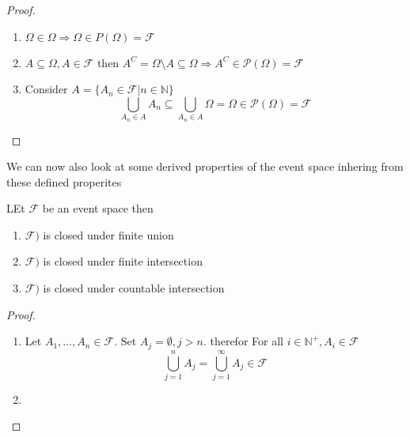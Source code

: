 \documentclass{article}
\begin{document}
\begin{proof}
    \begin{enumerate}
        \item $\Omega \in \Omega \Rightarrow\Omega \in P(\Omega) = \mathcal{F}$
        \item $A \subseteq \Omega,A \in \mathcal{F}$ then $A^C = \Omega\text{\textbackslash}A \subseteq \Omega \Rightarrow A^C \in \mathcal{P}(\Omega) = \mathcal{F}$
        \item Consider $A = \{A_n \in \mathcal{F}| n \in \mathbb{N}\}$
        \[\bigcup_{A_n \in A}A_n \subseteq \bigcup_{A_n \in A}\Omega = \Omega \in \mathcal{P}(\Omega) = \mathcal{F} \]
    \end{enumerate}
\end{proof}
We can now also look at some derived properties of the event space inhering from these defined properites
\begin{proposition}
    LEt $\mathcal{F}$ be an event space then
    \begin{enumerate}
        \item $\mathcal{F})$ is closed under finite union
        \item $\mathcal{F})$ is closed under finite intersection
        \item $\mathcal{F})$ is closed under countable intersection
    \end{enumerate}
\end{proposition}
\begin{proof}
    \begin{enumerate}
        \item Let $A_1,\dots,A_n \in \mathcal{F}$. Set $A_j = \emptyset,j > n$. therefor For all $i \in \mathbb{N^+},A_i \in \mathcal{F}$
        \[\bigcup_{j=1}^nA_j = \bigcup_{j=1}^\infty A_j \in \mathcal{F}\]
        \item 
    \end{enumerate}
\end{proof}
\end{document}
